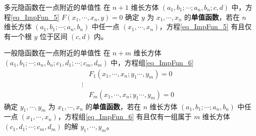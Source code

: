 \begin{definition}{多元隐函数在一点附近的单值性}
在 $n+1$ 维长方体 $(a_1,b_1;\cdots;a_n,b_n;c,d)$ 中，方程\autoref{eq_ImpFun_5} $F(x_1,\cdots,x_n,y)=0$ 确定 $y$ 为 $x_1,\cdots,x_n$ 的\textbf{单值函数}，若在 $n$ 维长方体 $(a_1,b_1;\cdots;a_n,b_n)$ 中任一点 $(x_1,\cdots,x_n)$，方程\autoref{eq_ImpFun_5} 有且仅有一个根 $y$ 位于区间 $(c,d)$ 内。
\end{definition}

\begin{definition}{一般隐函数在一点附近的单值性}
在 $n+m$ 维长方体 $(a_1,b_1;\cdots;a_n,b_n;c_1,d_1;\cdots;c_m,d_m)$ 中，方程组\autoref{eq_ImpFun_6} 
\begin{equation}
\begin{aligned}
&F_1(x_1,\cdots,x_n;y_1\cdots,y_m)=0\\
\vdots\\
&F_m(x_1,\cdots,x_n;y_1\cdots,y_m)=0
\end{aligned}~
\end{equation}
确定 $y_1,\cdots,y_m$ 为 $x_1,\cdots,x_n$ 的\textbf{单值函数}，若在 $n$ 维长方体 $(a_1,b_1;\cdots;a_n,b_n)$ 中任一点 $(x_1,\cdots,x_n)$，方程组\autoref{eq_ImpFun_6} 有且仅有一组属于 $m$ 维长方体 $(c_1,d_1;\cdots;c_m,d_m)$ 的解 $y_1,\cdots,y_m$。
\end{definition}